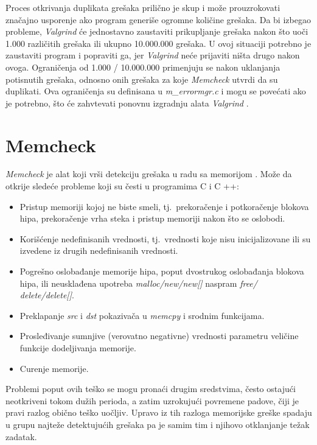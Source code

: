 \documentclass[12pt,oneside]{memoir}
\theoremstyle{plain}
\theoremstyle{definition}
\begin{document}
Proces otkrivanja duplikata grešaka prilično je skup i može prouzrokovati značajno usporenje ako program generiše ogromne količine grešaka. Da bi izbegao probleme, \textit{Valgrind} će jednostavno zaustaviti prikupljanje grešaka nakon što uoči 1.000 različitih grešaka ili ukupno 10.000.000 grešaka. U ovoj situaciji potrebno je zaustaviti program i popraviti ga, jer \textit{Valgrind} neće prijaviti ništa drugo nakon ovoga. Ograničenja od 1.000 / 10.000.000 primenjuju se nakon uklanjanja potisnutih grešaka, odnosno onih grešaka za koje \textit{Memcheck} utvrdi da su duplikati. Ova ograničenja su definisana u \textit{m\_errormgr.c} i mogu se povećati ako je potrebno, što će zahvtevati ponovnu izgradnju alata \textit{Valgrind} \cite{ValgrindCore}.

\section{Memcheck}
\textit{Memcheck} je alat koji vrši detekciju grešaka u radu sa memorijom \cite{Memcheck}. Može da otkrije sledeće probleme koji su česti u programima C i C ++:
\begin{itemize}
\item Pristup memoriji kojoj ne biste smeli, tj.~prekoračenje i potkoračenje blokova hipa, prekoračenje vrha steka i pristup memoriji nakon što se oslobodi.
\item Korišćenje nedefinisanih vrednosti, tj.~vrednosti koje nisu inicijalizovane ili su izvedene iz drugih nedefinisanih vrednosti.
\item Pogrešno oslobađanje memorije hipa, poput dvostrukog oslobađanja blokova hipa, ili neusklađena upotreba \textit{malloc/new/new[]} naspram \textit{free/ delete/delete[]}.
\item Preklapanje \textit{src} i \textit{dst} pokazivača u \textit{memcpy} i srodnim funkcijama.
\item Prosleđivanje sumnjive (verovatno negativne) vrednosti parametru veličine funkcije dodeljivanja memorije.
\item Curenje memorije.
\end{itemize}

Problemi poput ovih teško se mogu pronaći drugim sredstvima, često ostajući neotkriveni tokom dužih perioda, a zatim uzrokujući povremene padove, čiji je pravi razlog obično teško uočljiv. Upravo iz tih razloga memorijske greške spadaju u grupu najteže detektujućih grešaka pa je samim tim i njihovo otklanjanje težak zadatak.
\end{document}
